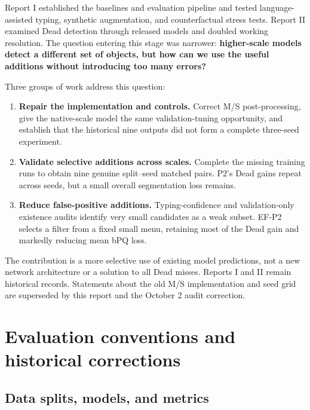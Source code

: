 \documentclass[11pt,a4paper]{article}
\begin{document}
Report I established the baselines and evaluation pipeline and tested language-assisted typing, synthetic augmentation, and counterfactual stress tests. Report II examined Dead detection through released models and doubled working resolution\cite{reports}. The question entering this stage was narrower: \textbf{higher-scale models detect a different set of objects, but how can we use the useful additions without introducing too many errors?}

Three groups of work address this question:
\begin{enumerate}
\item \textbf{Repair the implementation and controls.} Correct M/S post-processing, give the native-scale model the same validation-tuning opportunity, and establish that the historical nine outputs did not form a complete three-seed experiment.
\item \textbf{Validate selective additions across scales.} Complete the missing training runs to obtain nine genuine split--seed matched pairs. P2's Dead gains repeat across seeds, but a small overall segmentation loss remains.
\item \textbf{Reduce false-positive additions.} Typing-confidence and validation-only existence audits identify very small candidates as a weak subset. EF-P2 selects a filter from a fixed small menu, retaining most of the Dead gain and markedly reducing mean bPQ loss.
\end{enumerate}

The contribution is a more selective use of existing model predictions, not a new network architecture or a solution to all Dead misses. Reports I and II remain historical records. Statements about the old M/S implementation and seed grid are superseded by this report and the October 2 audit correction\cite{p0p3}.

\section{Evaluation conventions and historical corrections}

\subsection{Data splits, models, and metrics}
\end{document}

